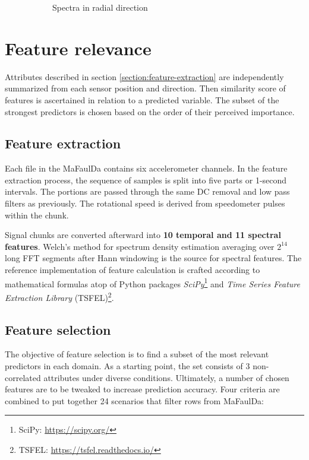\begin{figure}[ht]
\begin{subfigure}[b]{0.55\textwidth}
        \caption{Spectra in radial direction}
        \label{fig:design:fault-spectral-waveform}
    \end{subfigure} 
    \caption{}
\end{figure}




\section{Feature relevance}
Attributes described in section \ref{section:feature-extraction} are independently summarized from each sensor position and direction. Then similarity score of features is ascertained in relation to a predicted variable. The subset of the strongest predictors is chosen based on the order of their perceived importance.

\subsection{Feature extraction}
Each file in the MaFaulDa contains six accelerometer channels. In the feature extraction process, the sequence of samples is split into five parts or 1-second intervals. The portions are passed through the same DC removal and low pass filters as previously. The rotational speed is derived from speedometer pulses within the chunk.

Signal chunks are converted afterward into \textbf{10 temporal and 11 spectral features}. Welch's method for spectrum density estimation averaging over $2^{14}$ long FFT segments after Hann windowing is the source for spectral features. The reference implementation of feature calculation is crafted according to mathematical formulas atop of Python packages \emph{SciPy}\footnote{SciPy: \url{https://scipy.org/}} and \emph{Time Series Feature Extraction Library} (TSFEL)\footnote{TSFEL: \url{https://tsfel.readthedocs.io/}}.








\subsection{Feature selection}
The objective of feature selection is to find a subset of the most relevant predictors in each domain. As a starting point, the set consists of 3 non-correlated attributes under diverse conditions. Ultimately, a number of chosen features are to be tweaked to increase prediction accuracy. Four criteria are combined to put together 24 scenarios that filter rows from MaFaulDa:


